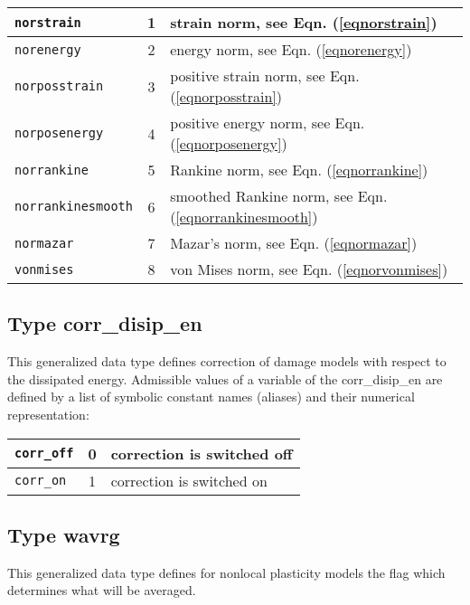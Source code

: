 \begin{center}
\begin{tabular}{|l|c|l|}
\hline
{\tt norstrain} & 1 & strain norm, see Eqn. (\ref{eqnorstrain})
\\ \hline
{\tt norenergy} & 2 & energy norm, see Eqn. (\ref{eqnorenergy})
\\ \hline
{\tt norposstrain} & 3 & positive strain norm, see Eqn. (\ref{eqnorposstrain})
\\ \hline
{\tt norposenergy} & 4 & positive energy norm, see Eqn. (\ref{eqnorposenergy})
\\ \hline
{\tt norrankine} & 5 & Rankine norm, see Eqn. (\ref{eqnorrankine})
\\ \hline
{\tt norrankinesmooth} & 6 & smoothed Rankine norm, see Eqn. (\ref{eqnorrankinesmooth})
\\ \hline
{\tt normazar} & 7 & Mazar's norm, see Eqn. (\ref{eqnormazar})
\\ \hline
{\tt vonmises} & 8 & von Mises norm, see Eqn. (\ref{eqnorvonmises})
\\ \hline
\end{tabular}
\end{center}

\subsection{Type {\sf corr\_disip\_en}}
\label{sectparamftype}

This generalized data type defines correction of damage models with respect to the dissipated energy.
Admissible values of a variable of the {\sf corr\_disip\_en} are defined by a list of symbolic
constant names (aliases) and their numerical representation:

\begin{center}
\begin{tabular}{|l|c|l|}
\hline
{\tt corr\_off} & 0 & correction is switched off
\\ \hline
{\tt corr\_on} & 1 & correction is switched on
\\ \hline
\end{tabular}
\end{center}

\subsection{Type {\sf wavrg}}
\label{sectwavrg}
This generalized data type defines for nonlocal plasticity
models the flag which determines what will be averaged.

